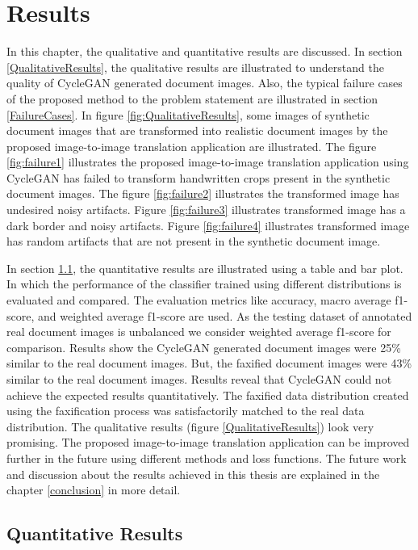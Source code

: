 \section{Results}\label{results}
In this chapter, the qualitative and quantitative results are discussed. In section \ref{QualitativeResults}, the qualitative results are illustrated to understand the quality of \ac{CycleGAN} generated document images. Also, the typical failure cases of the proposed method to the problem statement are illustrated in section \ref{FailureCases}. In figure \ref{fig:QualitativeResults}, some images of synthetic document images that are transformed into realistic document images by the proposed image-to-image translation application are illustrated. The figure \ref{fig:failure1} illustrates the proposed image-to-image translation application using \ac{CycleGAN} has failed to transform handwritten crops present in the synthetic document images. The figure \ref{fig:failure2} illustrates the transformed image has undesired noisy artifacts. Figure \ref{fig:failure3} illustrates transformed image has a dark border and noisy artifacts. Figure \ref{fig:failure4} illustrates transformed image has random artifacts that are not present in the synthetic document image.

In section \ref{QuantitativeResults}, the quantitative results are illustrated using a table and bar plot. In which the performance of the classifier trained using different distributions is evaluated and compared. The evaluation metrics like accuracy, macro average f1-score, and weighted average f1-score are used. As the testing dataset of annotated real document images is unbalanced we consider weighted average f1-score for comparison. Results show the \ac{CycleGAN} generated document images were 25\% similar to the real document images. But, the faxified document images were 43\% similar to the real document images. Results reveal that \ac{CycleGAN} could not achieve the expected results quantitatively. The faxified data distribution created using the faxification process was satisfactorily matched to the real data distribution. The qualitative results (figure \ref{QualitativeResults}) look very promising. The proposed image-to-image translation application can be improved further in the future using different methods and loss functions. The future work and discussion about the results achieved in this thesis are explained in the chapter \ref{conclusion} in more detail.

\subsection{Quantitative Results}\label{QuantitativeResults}


